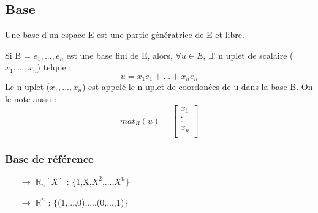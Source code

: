 \subsection{Base}
\begin{de}
Une base d'un espace E est une partie génératrice de E et libre.
\end{de}
\begin{prop}
Si B = {$e_1,...,e_n$} est une base fini de E, alors, $\forall u \in E$, $\exists !$ n uplet de scalaire ($x_1,...,x_n$) telque : $$u = x_1e_1+...+x_ne_n$$
Le n-uplet ($x_1,...,x_n$) est appelé le n-uplet de coordonées de u dans la base B. On le note aussi : 
$$mat_B(u) = \begin{bmatrix}
 x_1 \\
  . \\
  . \\
 x_n \\
\end{bmatrix}$$
\end{prop}
\subsubsection{Base de référence}
\begin{itemize}
 \item[$\rightarrow$] $\mathbb{R}_n[X]$ : $\{$1,X,$X^2$,...,$X^n$$\}$\\
 \item[$\rightarrow$] $\mathbb{R}^n$ : $\{$(1,...,0),...,(0,...,1)$\}$
\end{itemize}
